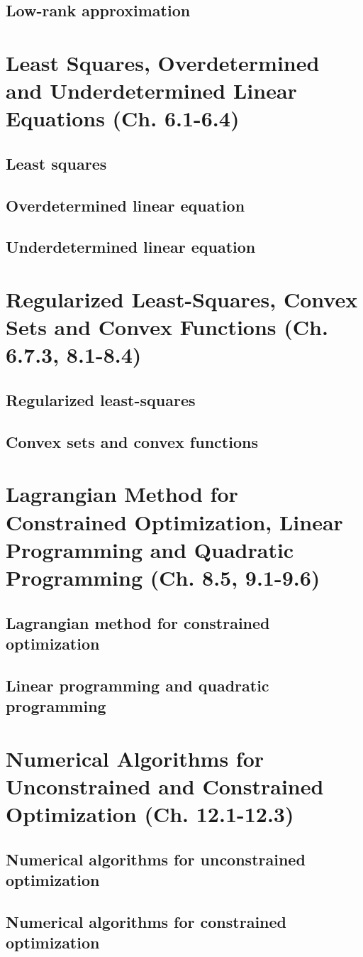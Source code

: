\documentclass{article}
\begin{document}
    \subsection{Low-rank approximation}

\section{Least Squares, Overdetermined and Underdetermined Linear Equations (Ch. 6.1-6.4)}
    \subsection{Least squares}
    \subsection{Overdetermined linear equation}
    \subsection{Underdetermined linear equation}

\section{Regularized Least-Squares, Convex Sets and Convex Functions (Ch. 6.7.3, 8.1-8.4)}
    \subsection{Regularized least-squares}
    \subsection{Convex sets and convex functions}

\section{Lagrangian Method for Constrained Optimization, Linear Programming and Quadratic Programming (Ch. 8.5, 9.1-9.6)}
    \subsection{Lagrangian method for constrained optimization}
    \subsection{Linear programming and quadratic programming}

\section{Numerical Algorithms for Unconstrained and Constrained Optimization (Ch. 12.1-12.3)}
    \subsection{Numerical algorithms for unconstrained optimization}
    \subsection{Numerical algorithms for constrained optimization}
\end{document}
